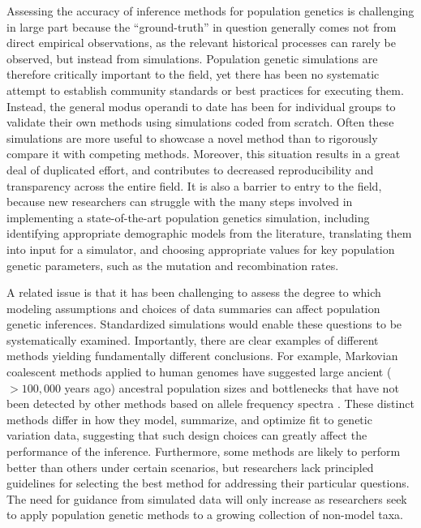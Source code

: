 \documentclass[12pt,halfline,a4paper]{ouparticle}
\begin{document}
Assessing the accuracy of inference methods for population genetics is
challenging in large part because the ``ground-truth'' in question
generally comes not from direct empirical observations, as the relevant
historical processes can rarely be observed, but instead from simulations.
Population genetic simulations are therefore critically important to the
field, yet there has been no systematic attempt to establish community
standards or best practices for executing them.
Instead, the general modus
operandi to date has been for individual groups to validate their own
methods using simulations coded from scratch.
Often these simulations are more useful to showcase a novel method than to
rigorously compare it with competing methods.
Moreover, this situation results in a great deal of duplicated effort,
and contributes to decreased reproducibility and transparency across the entire field.
It is also a barrier to entry to the field, because new researchers can
struggle with the many steps involved
in implementing a state-of-the-art population genetics simulation,
including identifying appropriate demographic models from the literature,
translating them into input for a simulator, and choosing appropriate values for key population genetic parameters,
such as the mutation and recombination rates.

A related issue is that it has been challenging to assess the degree to which modeling assumptions
and choices of data summaries can affect population genetic inferences.
Standardized simulations would enable these questions to be systematically examined.
Importantly, there are clear examples of different methods yielding fundamentally
different conclusions. For example, Markovian coalescent methods applied to human genomes have
suggested large ancient ($>100,000$ years ago) ancestral population sizes and
bottlenecks that have not been detected by other methods based on allele frequency spectra
\citep[see][]{beichman2017comparison}.
These distinct methods differ in how they model, summarize, and optimize fit to
genetic variation data, suggesting that such design choices can greatly affect the
performance of the inference. Furthermore, some methods are likely to
perform better than others under certain scenarios, but
researchers lack principled guidelines for selecting the best method for addressing
their particular questions. The need for
guidance from simulated data will only increase as researchers
seek to apply population genetic methods to a growing collection of non-model taxa.
\end{document}
